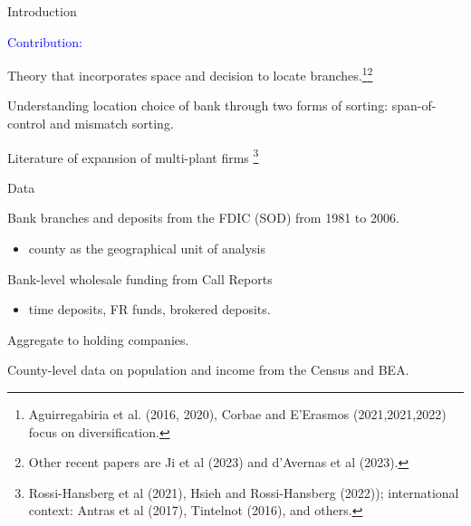 \documentclass[notes,10pt, aspectratio=169]{beamer}
\newenvironment{wideitemize}{\itemize\addtolength{\itemsep}{10pt}}{\enditemize}
\begin{document}
   \begin{frame}{Introduction}

    \begin{wideitemize}
      
    
        \item   \textcolor{blue}{Contribution:} 
               \vspace{0.2cm}
        \begin{wideitemize}
            \item Theory that incorporates space and decision to locate branches.\footnote{Aguirregabiria et al. (2016, 2020), Corbae and E'Erasmos (2021,2021,2022) focus on diversification.}\footnote{Other recent papers are Ji et al (2023) and d'Avernas et al (2023).}
    
            \item Understanding location choice of bank through two forms of sorting: span-of-control and mismatch sorting.
        
            \item Literature of expansion of multi-plant firms \footnote{Rossi-Hansberg et al (2021), Hsieh and Rossi-Hansberg (2022)); international context: Antras et al (2017), Tintelnot (2016), and others.}
        \end{wideitemize}
    \end{wideitemize}
       \end{frame}


    
        \begin{frame}{Data}
    
    \begin{wideitemize}
        \item Bank branches and deposits from the FDIC (SOD) from 1981 to 2006.
      \begin{itemize}
            \item county as the geographical unit of analysis
        \end{itemize} 
        \item Bank-level wholesale funding from Call Reports
        \begin{itemize}
            \item time deposits, FR funds, brokered deposits.
        \end{itemize}
        \item  Aggregate to holding companies.
    
        \item County-level data on population and income from the Census and BEA.
    \end{wideitemize}
    
            \end{frame}
    
\end{document}

